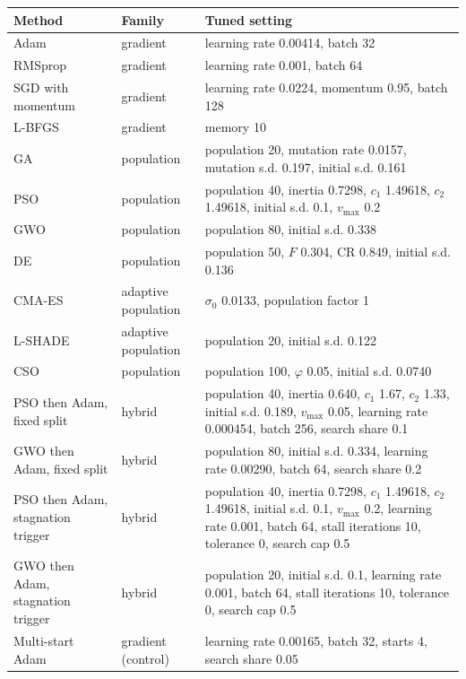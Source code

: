\begin{tabular}{>{\raggedright\arraybackslash}p{}>{\raggedright\arraybackslash}p{}>{\raggedright\arraybackslash}p{}}
\toprule
Method & Family & Tuned setting \\
\midrule
Adam & gradient & learning rate 0.00414, batch 32 \\
RMSprop & gradient & learning rate 0.001, batch 64 \\
SGD with momentum & gradient & learning rate 0.0224, momentum 0.95, batch 128 \\
L-BFGS & gradient & memory 10 \\
GA & population & population 20, mutation rate 0.0157, mutation s.d. 0.197, initial s.d. 0.161 \\
PSO & population & population 40, inertia 0.7298, $c_1$ 1.49618, $c_2$ 1.49618, initial s.d. 0.1, $v_{\max}$ 0.2 \\
GWO & population & population 80, initial s.d. 0.338 \\
DE & population & population 50, $F$ 0.304, CR 0.849, initial s.d. 0.136 \\
CMA-ES & adaptive population & $\sigma_0$ 0.0133, population factor 1 \\
L-SHADE & adaptive population & population 20, initial s.d. 0.122 \\
CSO & population & population 100, $\varphi$ 0.05, initial s.d. 0.0740 \\
PSO then Adam, fixed split & hybrid & population 40, inertia 0.640, $c_1$ 1.67, $c_2$ 1.33, initial s.d. 0.189, $v_{\max}$ 0.05, learning rate 0.000454, batch 256, search share 0.1 \\
GWO then Adam, fixed split & hybrid & population 80, initial s.d. 0.334, learning rate 0.00290, batch 64, search share 0.2 \\
PSO then Adam, stagnation trigger & hybrid & population 40, inertia 0.7298, $c_1$ 1.49618, $c_2$ 1.49618, initial s.d. 0.1, $v_{\max}$ 0.2, learning rate 0.001, batch 64, stall iterations 10, tolerance 0, search cap 0.5 \\
GWO then Adam, stagnation trigger & hybrid & population 20, initial s.d. 0.1, learning rate 0.001, batch 64, stall iterations 10, tolerance 0, search cap 0.5 \\
Multi-start Adam & gradient (control) & learning rate 0.00165, batch 32, starts 4, search share 0.05 \\
\bottomrule
\end{tabular}
